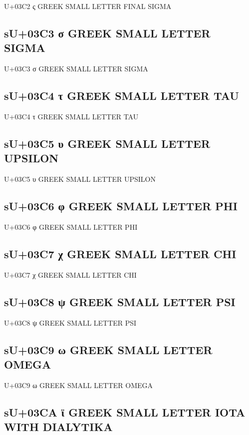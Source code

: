 U+03C2 ς GREEK SMALL LETTER FINAL SIGMA

\subsection{sU+03C3 σ GREEK SMALL LETTER SIGMA}

U+03C3 σ GREEK SMALL LETTER SIGMA

\subsection{sU+03C4 τ GREEK SMALL LETTER TAU}

U+03C4 τ GREEK SMALL LETTER TAU

\subsection{sU+03C5 υ GREEK SMALL LETTER UPSILON}

U+03C5 υ GREEK SMALL LETTER UPSILON

\subsection{sU+03C6 φ GREEK SMALL LETTER PHI}

U+03C6 φ GREEK SMALL LETTER PHI

\subsection{sU+03C7 χ GREEK SMALL LETTER CHI}

U+03C7 χ GREEK SMALL LETTER CHI

\subsection{sU+03C8 ψ GREEK SMALL LETTER PSI}

U+03C8 ψ GREEK SMALL LETTER PSI

\subsection{sU+03C9 ω GREEK SMALL LETTER OMEGA}

U+03C9 ω GREEK SMALL LETTER OMEGA

\subsection{sU+03CA ϊ GREEK SMALL LETTER IOTA WITH DIALYTIKA}

